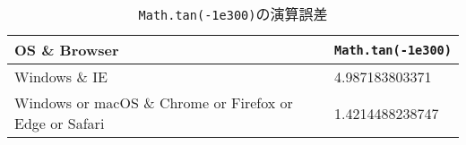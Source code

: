 \begin{table}[H]
    \begin{center}
    \caption{\texttt{Math.tan(-1e300)}の演算誤差}
    \label{tb-os_rst}
        \begin{tabularx}{\linewidth}{X|X}
        OS \& Browser & \texttt{Math.tan(-1e300)} \\ \hline\hline
        Windows \& IE & 4.987183803371 \\ \hline
        Windows or macOS \& Chrome or Firefox or Edge or Safari & 1.4214488238747 \\
        \end{tabularx}
    \end{center}
\end{table}